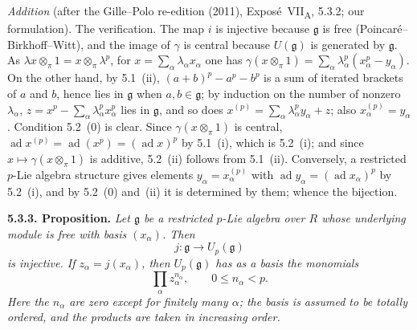 \par\medskip\noindent
\emph{Addition} (after the Gille--Polo re-edition (2011),
Expos\'e~VII\textsubscript{A}, 5.3.2; our formulation). The verification.
The map \(i\) is injective because \(\mathfrak g\) is free
(Poincar\'e--Birkhoff--Witt), and the image of \(\gamma\) is central
because \(U(\mathfrak g)\) is generated by \(\mathfrak g\). As
\(\lambda x\otimes_\pi1=x\otimes_\pi\lambda^p\), for
\(x=\sum_\alpha\lambda_\alpha x_\alpha\) one has
\(\gamma(x\otimes_\pi1)=\sum_\alpha\lambda_\alpha^p(x_\alpha^p-y_\alpha)\).
On the other hand, by 5.1~(ii), \((a+b)^p-a^p-b^p\) is a sum of iterated
brackets of \(a\) and \(b\), hence lies in \(\mathfrak g\) when
\(a,b\in\mathfrak g\); by induction on the number of nonzero
\(\lambda_\alpha\), \(z=x^p-\sum_\alpha\lambda_\alpha^px_\alpha^p\) lies in
\(\mathfrak g\), and so does
\(x^{(p)}=\sum_\alpha\lambda_\alpha^py_\alpha+z\); also
\(x_\alpha^{(p)}=y_\alpha\). Condition 5.2~(0) is clear. Since
\(\gamma(x\otimes_\pi1)\) is central,
\(\operatorname{ad}x^{(p)}=\operatorname{ad}(x^p)=(\operatorname{ad}x)^p\)
by 5.1~(i), which is 5.2~(i); and since
\(x\mapsto\gamma(x\otimes_\pi1)\) is additive, 5.2~(ii) follows from
5.1~(ii). Conversely, a restricted \(p\)-Lie algebra structure gives
elements \(y_\alpha=x_\alpha^{(p)}\) with
\(\operatorname{ad}y_\alpha=(\operatorname{ad}x_\alpha)^p\) by 5.2~(i),
and by 5.2~(0) and~(ii) it is determined by them; whence the bijection.

\medskip
\noindent\textbf{5.3.3. Proposition.}
\label{sga3:VIIA:5.3.3}
\textit{Let \(\mathfrak g\) be a restricted \(p\)-Lie algebra
over \(R\) whose underlying module is free with basis
\((x_\alpha)\). Then
\[
  j:\mathfrak g\longrightarrow U_p(\mathfrak g)
\]
is injective. If \(z_\alpha=j(x_\alpha)\), then
\(U_p(\mathfrak g)\) has as a basis the monomials
\[
  \prod_\alpha z_\alpha^{n_\alpha},
  \qquad
  0\le n_\alpha<p.
\]
Here the \(n_\alpha\) are zero except for finitely many
\(\alpha\); the basis is assumed to be totally ordered, and the
products are taken in increasing order.}

